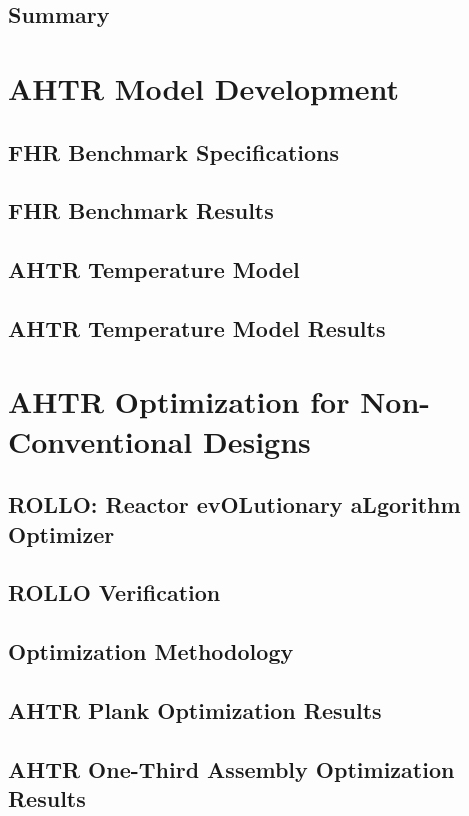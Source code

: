 \documentclass[9pt]{beamer}
\begin{document}
\subsection{Summary}


\section{AHTR Model Development}
\subsection{FHR Benchmark Specifications}

\subsection{FHR Benchmark Results}

\subsection{AHTR Temperature Model}

\subsection{AHTR Temperature Model Results}


\section{AHTR Optimization for Non-Conventional Designs}
\subsection{ROLLO: Reactor evOLutionary aLgorithm Optimizer}

\subsection{ROLLO Verification}
\subsection{Optimization Methodology}
\subsection{AHTR Plank Optimization Results}
\subsection{AHTR One-Third Assembly Optimization Results}
\end{document}
